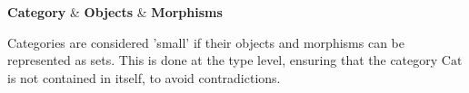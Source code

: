 \begin{table}
	\begin{tabular}[|l|l|l|]
		\hline
		\textbf{Category} & \textbf{Objects} & \textbf{Morphisms} \\
	\end{tabular}
	\caption{Examples of categories}
\end{table}
\begin{note}
	Categories are considered 'small' if their objects and morphisms can be
	represented as sets. This is done at the type level, ensuring that the
	category $\mathrm{Cat}$ is not contained in itself, to avoid
	contradictions.
\end{note}
